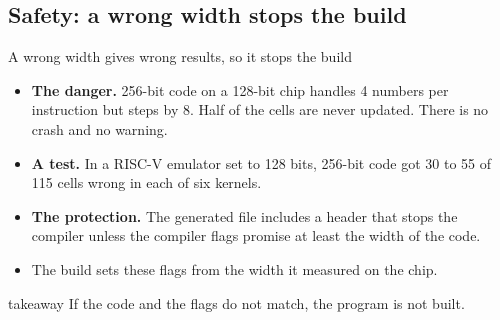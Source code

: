 \documentclass[aspectratio=169,10pt,t]{beamer}
\newcommand{\takeaway}[1]{\par\vfill
  \begin{beamercolorbox}[wd=\textwidth,sep=4pt,rounded=true]{takeaway}
    \small #1
  \end{beamercolorbox}}
\begin{document}
\subsection{Safety: a wrong width stops the build}
\begin{frame}{A wrong width gives wrong results, so it stops the build}
  \vspace{2mm}
  \begin{itemize}
    \item \textbf{The danger.} 256-bit code on a 128-bit chip handles 4 numbers per instruction but steps by 8.
          Half of the cells are never updated. There is no crash and no warning.
    \item \textbf{A test.} In a RISC-V emulator set to 128 bits, 256-bit code got 30 to 55 of 115 cells wrong in
          each of six kernels.
    \item \textbf{The protection.} The generated file includes a header that stops the compiler unless the
          compiler flags promise at least the width of the code.
    \item The build sets these flags from the width it measured on the chip.
  \end{itemize}
  \takeaway{If the code and the flags do not match, the program is not built.}
\end{frame}
\end{document}
